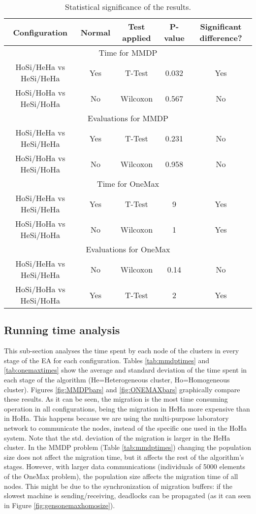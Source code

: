 \begin{table*}
\centering
\caption{Statistical significance of the results.}
\begin{tabular}{|c|c|c|c|c|} \hline
Configuration     &Normal &Test applied     &P-value & Significant difference?\\ \hline
\multicolumn{5}{|c|}{Time for MMDP} \\ \hline
HoSi/HeHa vs HeSi/HeHa  &Yes  &T-Test     & 0.032    & Yes \\ \hline
HoSi/HoHa vs HeSi/HoHa  &No   &Wilcoxon   &0.567   & No \\ \hline \hline
\multicolumn{5}{|c|}{Evaluations for MMDP}  \\ \hline
HoSi/HeHa vs HeSi/HeHa  &Yes  &T-Test     &0.231  & No \\ \hline
HoSi/HoHa vs HeSi/HoHa  &No   &Wilcoxon   &0.958  & No \\ \hline \hline
\multicolumn{5}{|c|}{Time for OneMax} \\ \hline
HoSi/HeHa vs HeSi/HeHa  & Yes & T-Test    &  9\e{-15} & Yes \\ \hline
HoSi/HoHa vs HeSi/HoHa  & No  & Wilcoxon    &   1\e{-6} & Yes \\ \hline \hline
\multicolumn{5}{|c|}{Evaluations for OneMax}  \\ \hline
HoSi/HeHa vs HeSi/HeHa  & No  & Wilcoxon    & 0.14    & No\\ \hline
HoSi/HoHa vs HeSi/HoHa  & Yes & T-Test    & 2\e{-27}  & Yes \\ \hline

\end{tabular}
\label{tab:significance}
\end{table*}

\subsection{Running time analysis}

This sub-section analyses the time spent by each node of the clusters in every stage of the EA for each configuration. Tables \ref{tab:mmdptimes} and \ref{tab:onemaxtimes} show the average and standard deviation of the time spent in each stage of the algorithm (He=Heterogeneous cluster, Ho=Homogeneous cluster). Figures \ref{fig:MMDPbars} and \ref{fig:ONEMAXbars} graphically compare these results. As it can be seen, the migration is the most time consuming operation in all configurations, being the migration in HeHa more expensive than in HoHa. This happens because we are using the multi-purpose laboratory network to communicate the nodes, instead of the specific one used in the HoHa system. Note that the std. deviation of the migration is larger in the HeHa cluster. In the MMDP problem (Table \ref{tab:mmdptimes}) changing the population size does not affect the migration time, but it affects the rest of the algorithm's stages. However, with larger data communications (individuals of 5000 elements of the OneMax problem), the population size affects the migration time of all nodes. This might be due to the synchronization of migration buffers: if the slowest machine is sending/receiving, deadlocks can be propagated (as it can seen in Figure \ref{fig:gensonemaxhomosize}). 

